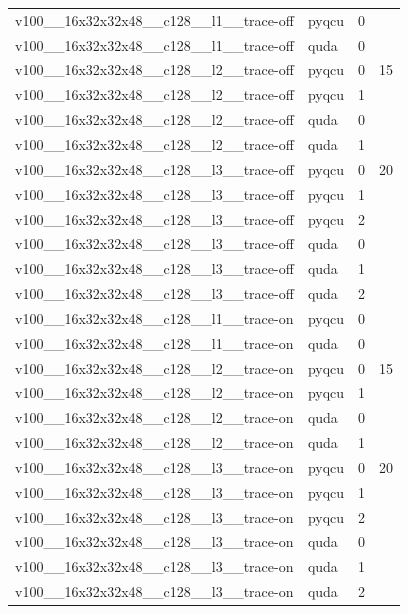 \begin{table}[htbp]
\begin{tabular}{@{}llrr@{}}
v100\_\_16x32x32x48\_\_c128\_\_l1\_\_trace-off & pyqcu & 0 &  \\
v100\_\_16x32x32x48\_\_c128\_\_l1\_\_trace-off & quda & 0 &  \\
v100\_\_16x32x32x48\_\_c128\_\_l2\_\_trace-off & pyqcu & 0 & 15 \\
v100\_\_16x32x32x48\_\_c128\_\_l2\_\_trace-off & pyqcu & 1 &  \\
v100\_\_16x32x32x48\_\_c128\_\_l2\_\_trace-off & quda & 0 &  \\
v100\_\_16x32x32x48\_\_c128\_\_l2\_\_trace-off & quda & 1 &  \\
v100\_\_16x32x32x48\_\_c128\_\_l3\_\_trace-off & pyqcu & 0 & 20 \\
v100\_\_16x32x32x48\_\_c128\_\_l3\_\_trace-off & pyqcu & 1 &  \\
v100\_\_16x32x32x48\_\_c128\_\_l3\_\_trace-off & pyqcu & 2 &  \\
v100\_\_16x32x32x48\_\_c128\_\_l3\_\_trace-off & quda & 0 &  \\
v100\_\_16x32x32x48\_\_c128\_\_l3\_\_trace-off & quda & 1 &  \\
v100\_\_16x32x32x48\_\_c128\_\_l3\_\_trace-off & quda & 2 &  \\
v100\_\_16x32x32x48\_\_c128\_\_l1\_\_trace-on & pyqcu & 0 &  \\
v100\_\_16x32x32x48\_\_c128\_\_l1\_\_trace-on & quda & 0 &  \\
v100\_\_16x32x32x48\_\_c128\_\_l2\_\_trace-on & pyqcu & 0 & 15 \\
v100\_\_16x32x32x48\_\_c128\_\_l2\_\_trace-on & pyqcu & 1 &  \\
v100\_\_16x32x32x48\_\_c128\_\_l2\_\_trace-on & quda & 0 &  \\
v100\_\_16x32x32x48\_\_c128\_\_l2\_\_trace-on & quda & 1 &  \\
v100\_\_16x32x32x48\_\_c128\_\_l3\_\_trace-on & pyqcu & 0 & 20 \\
v100\_\_16x32x32x48\_\_c128\_\_l3\_\_trace-on & pyqcu & 1 &  \\
v100\_\_16x32x32x48\_\_c128\_\_l3\_\_trace-on & pyqcu & 2 &  \\
v100\_\_16x32x32x48\_\_c128\_\_l3\_\_trace-on & quda & 0 &  \\
v100\_\_16x32x32x48\_\_c128\_\_l3\_\_trace-on & quda & 1 &  \\
v100\_\_16x32x32x48\_\_c128\_\_l3\_\_trace-on & quda & 2 &  \\
\bottomrule
\end{tabular}
\end{table}

